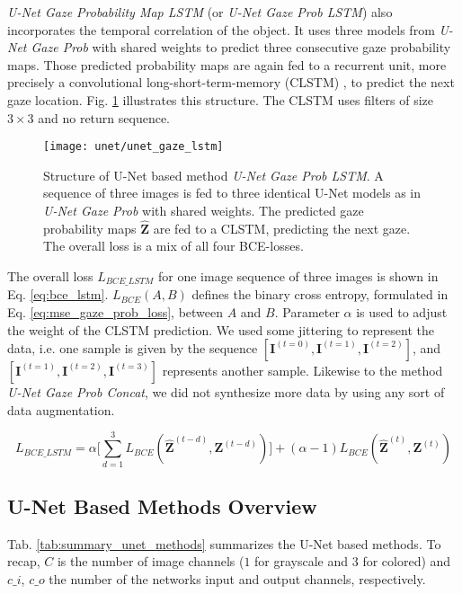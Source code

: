\textit{U-Net Gaze Probability Map LSTM} (or \textit{U-Net Gaze Prob LSTM}) also incorporates the temporal correlation of the object. It uses three models from \textit{U-Net Gaze Prob} with shared weights to predict three consecutive gaze probability maps. Those predicted probability maps are again fed to a recurrent unit, more precisely a convolutional long-short-term-memory (CLSTM) \cite{shi15}, to predict the next gaze location. Fig. \ref{fig:unet_gaze_lstm} illustrates this structure. The CLSTM uses filters of size $3 \times 3$ and no return sequence.

\endgroup

\begin{figure}[htbp]
  \centering
  \texttt{[image: unet/unet\_gaze\_lstm]}
  \caption[Structure of U-Net Gaze Prob Map LSTM]{Structure of U-Net based method \textit{U-Net Gaze Prob LSTM}. A sequence of three images is fed to three identical U-Net models as in \textit{U-Net Gaze Prob} with shared weights. The predicted gaze probability maps $\boldsymbol{\hat{Z}}$ are fed to a CLSTM, predicting the next gaze. The overall loss is a mix of all four BCE-losses.}
  \label{fig:unet_gaze_lstm}
\end{figure}

The overall loss $L_{BCE\_LSTM}$ for one image sequence of three images is shown in Eq. \ref{eq:bce_lstm}. $L_{BCE}(A,B)$ defines the binary cross entropy, formulated in Eq. \ref{eq:mse_gaze_prob_loss}, between $A$ and $B$. Parameter $\alpha$ is used to adjust the weight of the CLSTM prediction. We used some jittering to represent the data, i.e. one sample is given by the sequence $[\boldsymbol{I}^{(t=0)}, \boldsymbol{I}^{(t=1)}, \boldsymbol{I}^{(t=2)}]$, and $[\boldsymbol{I}^{(t=1)}, \boldsymbol{I}^{(t=2)}, \boldsymbol{I}^{(t=3)}]$ represents another sample. Likewise to the method \textit{U-Net Gaze Prob Concat}, we did not synthesize more data by using any sort of data augmentation.

\begin{equation}
L_{BCE\_LSTM} = \alpha \Big[\sum_{d=1}^3 L_{BCE}(\boldsymbol{\hat{Z}}^{(t-d)}, \boldsymbol{Z}^{(t-d)})\Big] + (\alpha - 1) L_{BCE}(\boldsymbol{\hat{Z}}^{(t)}, \boldsymbol{Z}^{(t)})
\label{eq:bce_lstm}
\end{equation}
\hspace{6pt}

\clearpage
\subsection{U-Net Based Methods Overview}
Tab. \ref{tab:summary_unet_methods} summarizes the U-Net based methods. To recap, $C$ is the number of image channels ($1$ for grayscale and $3$ for colored) and $c\_i$, $c\_o$ the number of the networks input and output channels, respectively.

